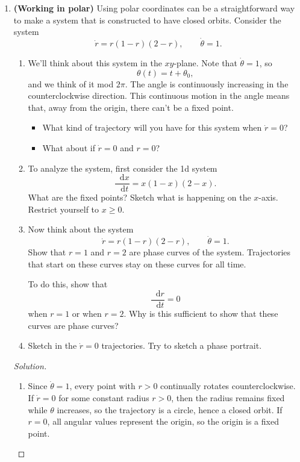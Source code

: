 \documentclass[12pt]{amsart}
\theoremstyle{plain}
\theoremstyle{definition}
\theoremstyle{definition}
\theoremstyle{plain}
\newenvironment{solution}
{\begin{proof}[Solution]}
{\end{proof}}
\newcommand{\dd}{\mathop{}\!\mathrm{d}}
\begin{document}
\begin{enumerate}[label=\arabic*.]
        \item \textbf{(Working in polar)}
        Using polar coordinates can be a straightforward way to make a system that is constructed
        to have closed orbits. Consider the system
        \[
            \dot r=r(1-r)(2-r),
            \qquad
            \dot\theta=1.
        \]
        \begin{enumerate}[label=(\alph*)]
            \item We'll think about this system in the $xy$-plane. Note that $\dot\theta=1$, so
            \[
                \theta(t)=t+\theta_0,
            \]
            and we think of it mod $2\pi$. The angle is continuously increasing in the
            counterclockwise direction. This continuous motion in the angle means that, away from
            the origin, there can't be a fixed point.
            \begin{itemize}
                \item What kind of trajectory will you have for this system when $\dot r=0$?
                \item What about if $\dot r=0$ and $r=0$?
            \end{itemize}

            \item To analyze the system, first consider the 1d system
            \[
                \frac{\dd x}{\dd t}=x(1-x)(2-x).
            \]
            What are the fixed points? Sketch what is happening on the $x$-axis.
            Restrict yourself to $x\ge0$.

            \item Now think about the system
            \[
                \dot r=r(1-r)(2-r),
                \qquad
                \dot\theta=1.
            \]
            Show that $r=1$ and $r=2$ are phase curves of the system. Trajectories that start
            on these curves stay on these curves for all time.

            To do this, show that
            \[
                \frac{\dd r}{\dd t}=0
            \]
            when $r=1$ or when $r=2$. Why is this sufficient to show that these curves are
            phase curves?

            \item Sketch in the $\dot r=0$ trajectories. Try to sketch a phase portrait.
        \end{enumerate}

        \begin{solution}
            \begin{enumerate}[label=(\alph*)]
                \item Since $\dot\theta=1$, every point with $r>0$ continually rotates counterclockwise. If $\dot r=0$ for some constant radius $r>0$, then the radius remains fixed while $\theta$ increases, so the trajectory is a circle, hence a closed orbit. If $r=0$, all angular values represent the origin, so the origin is a fixed point.


\end{enumerate}
\end{solution}
\end{enumerate}
\end{document}
